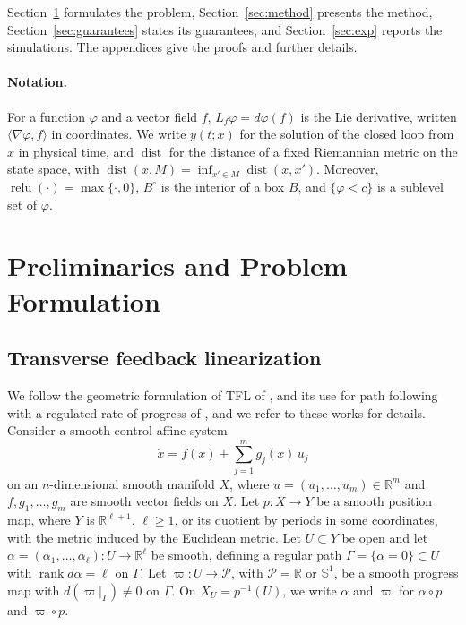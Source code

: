 \documentclass{l4dc2027}
\newcommand{\R}{\mathbb{R}}
\newcommand{\dist}{\operatorname{dist}}
\newcommand{\relu}{\operatorname{relu}}
\begin{document}
\vspace{-0.1in}

Section~\ref{sec:problem} formulates the problem, Section~\ref{sec:method} presents the method, Section~\ref{sec:guarantees} states its guarantees, and Section~\ref{sec:exp} reports the simulations. The appendices give the proofs and further details.

\vspace{-0.04in}

\paragraph{Notation.} For a function $\varphi$ and a vector field $f$, $L_f\varphi=d\varphi(f)$ is the Lie derivative, written $\langle\nabla\varphi,f\rangle$ in coordinates. We write $y(t;x)$ for the solution of the closed loop from $x$ in physical time, and $\dist$ for the distance of a fixed Riemannian metric on the state space, with $\dist(x,M)=\inf_{x'\in M}\dist(x,x')$. Moreover, $\relu(\cdot)=\max\{\cdot,0\}$, $B^\circ$ is the interior of a box $B$, and $\{\varphi<c\}$ is a sublevel set of $\varphi$.


\vspace{-0.15in}

\section{Preliminaries and Problem Formulation}\label{sec:problem}

\subsection{Transverse feedback linearization}\label{sec:tfl}
 We follow the geometric formulation of TFL of \citet{nielsen2008}, and its use for path following with a regulated rate of progress of \citet{akhtar2015}, and we refer to these works for details. Consider a smooth control-affine system
\begin{equation}\label{eq:sys}
\dot x=f(x)+\sum_{j=1}^m g_j(x)\,u_j
\end{equation}
on an $n$-dimensional smooth manifold $X$, where $u=(u_1,\dots,u_m)\in\R^m$ and $f,g_1,\dots,g_m$ are smooth vector fields on $X$. Let $p:X\to Y$ be a smooth position map, where $Y$ is $\R^{\ell+1}$, $\ell\ge1$, or its quotient by periods in some coordinates, with the metric induced by the Euclidean metric. Let $U\subset Y$ be open and let $\alpha=(\alpha_1,\dots,\alpha_\ell):U\to\R^\ell$ be smooth, defining a regular path $\Gamma=\{\alpha=0\}\subset U$ with $\operatorname{rank}d\alpha=\ell$ on $\Gamma$. Let $\varpi:U\to\mathcal P$, with $\mathcal P=\R$ or $\mathbb S^1$, be a smooth progress map with $d(\varpi|_\Gamma)\ne0$ on $\Gamma$. On $X_U=p^{-1}(U)$, we write $\alpha$ and $\varpi$ for $\alpha\circ p$ and $\varpi\circ p$.
\end{document}
